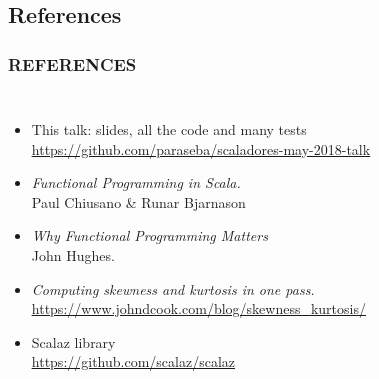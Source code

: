 \documentclass{beamer}
\begin{document}
\subsection*{References}
\begin{frame} \frametitle{REFERENCES}
  \begin{columns}[c]
      \begin{itemize}

        \item This talk: slides, all the \alert{code and many tests} \\
          \href{https://github.com/paraseba/scaladores-may-2018-talk}{\underline{https://github.com/paraseba/scaladores-may-2018-talk}} %

        \item \textit{Functional Programming in Scala.}\\ Paul Chiusano \& Runar Bjarnason

        \item \textit{Why Functional Programming Matters} \\
          John Hughes.

        \item \textit{Computing skewness and kurtosis in one pass.} \\
          {\footnotesize \href{https://www.johndcook.com/blog/skewness\_kurtosis/}{\underline{https://www.johndcook.com/blog/skewness\_kurtosis/}}}

        \item Scalaz library \\
          {\href{https://github.com/scalaz/scalaz}{\underline{https://github.com/scalaz/scalaz}}}
      \end{itemize}



\end{columns}
\end{frame}
\end{document}
